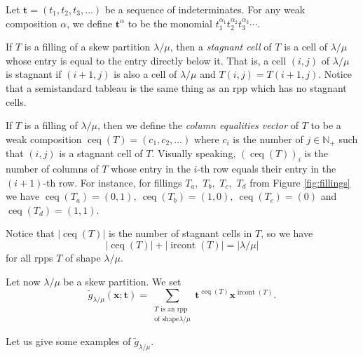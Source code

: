 \documentclass[numbers=enddot,12pt,final,onecolumn,notitlepage]{scrartcl}%
\theoremstyle{definition}
\let\sumnonlimits\sum
\renewcommand{\sum}{\sumnonlimits\limits}
\def\ceq{{\operatorname*{ceq}}}
\def\ircont{{\operatorname*{ircont}}}
\def\t{{\mathbf{t}}}
\def\lm{{\lambda/\mu}}
\begin{document}
 Let $\t=\left(t_{1},t_{2},t_{3},\ldots\right)$ be a sequence of indeterminates. For any weak composition $\alpha$, we define $\t^\alpha$ to be the monomial $t_1^{\alpha_1} t_2^{\alpha_2} t_3^{\alpha_3} \cdots$.

 If $T$ is a filling of a skew partition $\lm$,
then a \textit{stagnant cell} of $T$ is a cell of $\lm$ whose entry is equal to the entry directly below it. That is, a cell $\left(  i,j\right)  $
of $\lm$ is stagnant if $\left(  i+1,j\right)  $ is also a cell of $\lm$ and 
$T\left(  i,j\right)  =T\left(  i+1,j\right)  $. Notice that a semistandard
tableau is the same thing as an rpp which has no stagnant
cells.


 If $T$ is a filling of $\lm$,
then we define the \textit{column equalities vector} of $T$ to be a weak composition $\operatorname*{ceq}\left(  T\right)=\left(c_1,c_2,\dots\right)$ 
where $c_i$ is the number of $j\in\mathbb{N}_{+}$ such that $\left(  i,j\right)$ is a stagnant cell of $T$. Visually speaking, $\left(  \operatorname*{ceq}\left(  T\right)  \right)
_{i}$ is the number of columns of $T$ whose entry in the $i$-th row equals
their entry in the $\left(  i+1\right)  $-th row. For instance, for fillings $T_a,$ $T_b,$ $T_c,$ $T_d$ from Figure \ref{fig:fillings} we have $\ceq(T_a)=(0,1),\ \ceq(T_b)=(1,0),\ \ceq(T_c)=(0)$ and $\ceq(T_d)=(1,1)$. 

Notice that $\left|\ceq(T)\right|$ is the number of stagnant cells in $T$, so we have 
\begin{equation}\label{eq:sum.of.ceq.and.ircont}
 \left|\ceq(T)\right|+\left|\ircont(T)\right|=\left|\lm\right|
\end{equation}
 for all rpps $T$ of shape $\lm$. 




Let now $\lambda/\mu$ be a skew partition. We set%
\[
\widetilde{g}_{\lambda/\mu}(\mathbf{x};\t)=\sum_{\substack{T\text{ is an rpp}\\\text{of shape
}\lm  }}\mathbf{t}^{\operatorname*{ceq}\left(
T\right)  }\mathbf{x}^{\operatorname*{ircont}\left(  T\right)  }.
\]



Let us give some examples of $\widetilde{g}_{\lambda/\mu}$.
\end{document}
